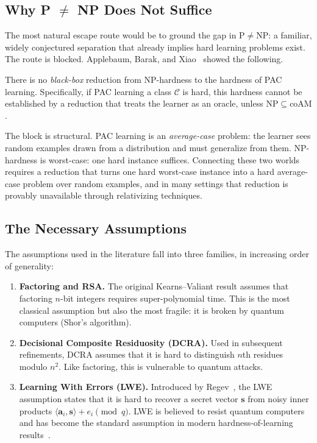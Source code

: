 \subsection{Why P $\neq$ NP Does Not Suffice}

The most natural escape route would be to ground the gap in $\mathrm{P} \neq
\mathrm{NP}$: a familiar, widely conjectured separation that already implies
hard learning problems exist.  The route is blocked.  Applebaum, Barak, and
Xiao~\cite{ApplebaumBarakXiao2008} showed the following.

\begin{thm}
\label{thm:abx}
There is no \emph{black-box} reduction from $\mathrm{NP}$-hardness to the
hardness of PAC learning.  Specifically, if PAC learning a class $\mathcal{C}$
is hard, this hardness cannot be established by a reduction that treats the
learner as an oracle, unless $\mathrm{NP} \subseteq \mathrm{coAM}$.
\end{thm}

The block is structural.  PAC learning is an \emph{average-case} problem: the
learner sees random examples drawn from a distribution and must generalize from
them.  $\mathrm{NP}$-hardness is worst-case: one hard instance suffices.
Connecting these two worlds requires a reduction that turns one hard
worst-case instance into a hard average-case problem over random examples, and
in many settings that reduction is provably unavailable through relativizing
techniques.

\subsection{The Necessary Assumptions}

The assumptions used in the literature fall into three families, in
increasing order of generality:

\begin{enumerate}[leftmargin=*,itemsep=3pt]
\item \textbf{Factoring and RSA.}  The original Kearns--Valiant result
  assumes that factoring $n$-bit integers requires super-polynomial time.
  This is the most classical assumption but also the most fragile: it is
  broken by quantum computers (Shor's algorithm).

\item \textbf{Decisional Composite Residuosity (DCRA).}  Used in subsequent
  refinements, DCRA assumes that it is hard to distinguish $n$th residues
  modulo $n^2$.  Like factoring, this is vulnerable to quantum attacks.

\item \textbf{Learning With Errors (LWE).}  Introduced by
  Regev~\cite{Regev2005}, the LWE assumption states that it is hard to recover
  a secret vector $\mathbf{s}$ from noisy inner products
  $\langle \mathbf{a}_i, \mathbf{s} \rangle + e_i \pmod{q}$.  LWE is
  believed to resist quantum computers and has become the standard assumption
  in modern hardness-of-learning results~\cite{Daniely2021}.
\end{enumerate}

